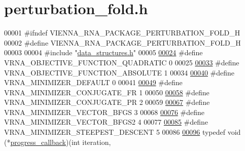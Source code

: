 \hypertarget{perturbation__fold_8h_source}{}\section{perturbation\+\_\+fold.\+h}
\label{perturbation__fold_8h_source}

\begin{DoxyCode}
00001 \textcolor{preprocessor}{#ifndef VIENNA\_RNA\_PACKAGE\_PERTURBATION\_FOLD\_H}
00002 \textcolor{preprocessor}{#define VIENNA\_RNA\_PACKAGE\_PERTURBATION\_FOLD\_H}
00003 
00004 \textcolor{preprocessor}{#include "\mbox{\hyperlink{data__structures_8h}{data\_structures.h}}"}
00005 
\mbox{\hyperlink{group__perturbation_ga81e10993d1ae728e4e02022b33155a12}{00024}} \textcolor{preprocessor}{#define VRNA\_OBJECTIVE\_FUNCTION\_QUADRATIC 0}
00025 
\mbox{\hyperlink{group__perturbation_gac070dfb9cafaeb14d5652bd9adf0f6b1}{00033}} \textcolor{preprocessor}{#define VRNA\_OBJECTIVE\_FUNCTION\_ABSOLUTE 1}
00034 
\mbox{\hyperlink{group__perturbation_gae5126200d80dbb282f46083fffc606bf}{00040}} \textcolor{preprocessor}{#define VRNA\_MINIMIZER\_DEFAULT 0}
00041 
\mbox{\hyperlink{group__perturbation_gab1d89db58e8c497795a5005f5dbc8c4a}{00049}} \textcolor{preprocessor}{#define VRNA\_MINIMIZER\_CONJUGATE\_FR 1}
00050 
\mbox{\hyperlink{group__perturbation_ga5aaeafe1b0aa77a5cda18943ff94b02f}{00058}} \textcolor{preprocessor}{#define VRNA\_MINIMIZER\_CONJUGATE\_PR 2}
00059 
\mbox{\hyperlink{group__perturbation_ga9be8a702cddf58235571ace11cc41b22}{00067}} \textcolor{preprocessor}{#define VRNA\_MINIMIZER\_VECTOR\_BFGS 3}
00068 
\mbox{\hyperlink{group__perturbation_ga7b0a65c6c92fa1d8012383ba9d3dcb4f}{00076}} \textcolor{preprocessor}{#define VRNA\_MINIMIZER\_VECTOR\_BFGS2 4}
00077 
\mbox{\hyperlink{group__perturbation_ga9ecd2144c2ebed7533233da3986521b0}{00085}} \textcolor{preprocessor}{#define VRNA\_MINIMIZER\_STEEPEST\_DESCENT 5}
00086 
\mbox{\hyperlink{group__perturbation_gaa715397c7afd2d2955c315512a3d571a}{00096}} \textcolor{keyword}{typedef} void (*\mbox{\hyperlink{group__perturbation_gaa715397c7afd2d2955c315512a3d571a}{progress\_callback}})(\textcolor{keywordtype}{int}     iteration,

\end{DoxyCode}

